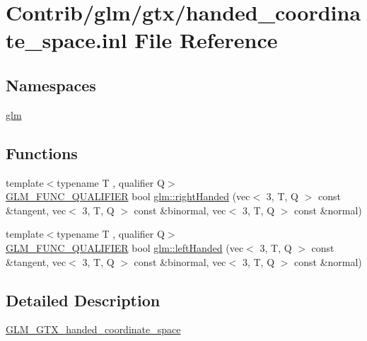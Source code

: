 \hypertarget{handed__coordinate__space_8inl}{}\section{Contrib/glm/gtx/handed\+\_\+coordinate\+\_\+space.inl File Reference}
\label{handed__coordinate__space_8inl}
\subsection*{Namespaces}
\begin{DoxyCompactItemize}
\item 
 \mbox{\hyperlink{namespaceglm}{glm}}
\end{DoxyCompactItemize}
\subsection*{Functions}
\begin{DoxyCompactItemize}
\item 
{\footnotesize template$<$typename T , qualifier Q$>$ }\\\mbox{\hyperlink{setup_8hpp_a33fdea6f91c5f834105f7415e2a64407}{G\+L\+M\+\_\+\+F\+U\+N\+C\+\_\+\+Q\+U\+A\+L\+I\+F\+I\+ER}} bool \mbox{\hyperlink{group__gtx__handed__coordinate__space_ga99386a5ab5491871b947076e21699cc8}{glm\+::right\+Handed}} (vec$<$ 3, T, Q $>$ const \&tangent, vec$<$ 3, T, Q $>$ const \&binormal, vec$<$ 3, T, Q $>$ const \&normal)
\item 
{\footnotesize template$<$typename T , qualifier Q$>$ }\\\mbox{\hyperlink{setup_8hpp_a33fdea6f91c5f834105f7415e2a64407}{G\+L\+M\+\_\+\+F\+U\+N\+C\+\_\+\+Q\+U\+A\+L\+I\+F\+I\+ER}} bool \mbox{\hyperlink{group__gtx__handed__coordinate__space_ga6f1bad193b9a3b048543d1935cf04dd3}{glm\+::left\+Handed}} (vec$<$ 3, T, Q $>$ const \&tangent, vec$<$ 3, T, Q $>$ const \&binormal, vec$<$ 3, T, Q $>$ const \&normal)
\end{DoxyCompactItemize}


\subsection{Detailed Description}
\mbox{\hyperlink{group__gtx__handed__coordinate__space}{G\+L\+M\+\_\+\+G\+T\+X\+\_\+handed\+\_\+coordinate\+\_\+space}} 